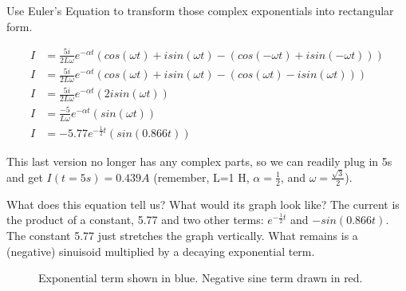 Use Euler's Equation to transform those complex exponentials into rectangular form.

\begin{align*}
I&=\frac{5i}{2L\omega}e^{-\alpha t}(cos(\omega t)+isin(\omega t)-(cos(-\omega t)+isin(-\omega t)))\\
I&=\frac{5i}{2L\omega}e^{-\alpha t}(cos(\omega t)+isin(\omega t)-(cos(\omega t)-isin(\omega t)))\\
I&=\frac{5i}{2L\omega}e^{-\alpha t}(2isin(\omega t))\\
I&=\frac{-5}{L\omega}e^{-\alpha t}(sin(\omega t))\\
I&=-5.77e^{-\frac{1}{2} t}(sin(0.866 t))
\end{align*} 

This last version no longer has any complex parts, so we can readily plug in 5s and get $I(t=5s)=0.439A$ (remember, L=1 H, $\alpha=\frac{1}{2}$, and $\omega=\frac{\sqrt{3}}{2}$).\par 

What does this equation tell us? What would its graph look like? The current is the product of a constant, 5.77 and two other terms: $e^{-\frac{1}{2}t}$ and $-sin(0.866t)$. The constant 5.77 just stretches the graph vertically. What remains is a (negative) sinuisoid multiplied by a decaying exponential term. 

\begin{figure}[H]
\begin{center}
\caption{Exponential term shown in blue. Negative sine term drawn in red.}
\label{F:6RLCG2}
\end{center}
\end{figure}

